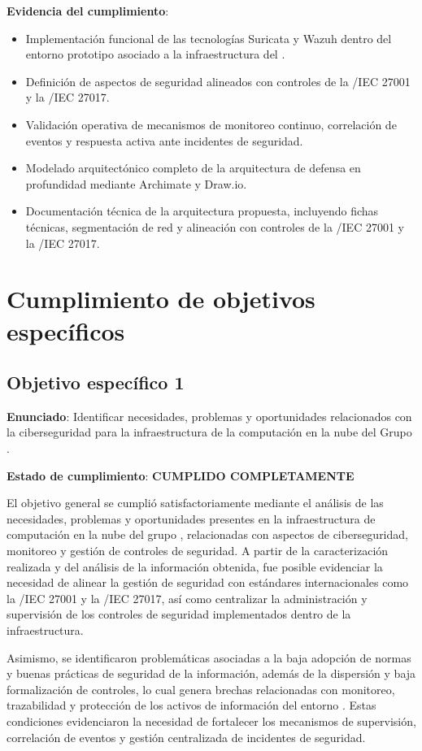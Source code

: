 \textbf{Evidencia del cumplimiento}:
\begin{itemize}
	\item Implementación funcional de las tecnologías Suricata y Wazuh dentro del entorno prototipo asociado a la infraestructura del \GRID.
	\item Definición de aspectos de seguridad alineados con controles de la \ISO/IEC 27001 y la \ISO/IEC 27017.
	\item Validación operativa de mecanismos de monitoreo continuo, correlación de eventos y respuesta activa ante incidentes de seguridad.
	\item Modelado arquitectónico completo de la arquitectura de defensa en profundidad mediante Archimate y Draw.io.
	\item Documentación técnica de la arquitectura propuesta, incluyendo fichas técnicas, segmentación de red y alineación con controles de la \ISO/IEC 27001 y la \ISO/IEC 27017.
\end{itemize}

\section{Cumplimiento de objetivos específicos}
\noindent

\subsection{Objetivo específico 1}
\noindent

\textbf{Enunciado}: Identificar necesidades, problemas y oportunidades relacionados con la ciberseguridad para la infraestructura de 
la computación en la nube del Grupo \GRID.

\textbf{Estado de cumplimiento}: \textbf{CUMPLIDO COMPLETAMENTE}

El objetivo general se cumplió satisfactoriamente mediante el análisis de las necesidades, problemas y oportunidades presentes en la 
infraestructura de computación en la nube del grupo \GRID, relacionadas con aspectos de ciberseguridad, monitoreo y gestión de controles de 
seguridad. A partir de la caracterización realizada y del análisis de la información obtenida, fue posible evidenciar la necesidad de 
alinear la gestión de seguridad con estándares internacionales como la \ISO/IEC 27001 y la \ISO/IEC 27017, así como centralizar la 
administración y supervisión de los controles de seguridad implementados dentro de la infraestructura.

Asimismo, se identificaron problemáticas asociadas a la baja adopción de normas y buenas prácticas de seguridad de la información, además 
de la dispersión y baja formalización de controles, lo cual genera brechas relacionadas con monitoreo, trazabilidad y protección de los 
activos de información del entorno \GRID. Estas condiciones evidenciaron la necesidad de fortalecer los mecanismos de supervisión, 
correlación de eventos y gestión centralizada de incidentes de seguridad.

